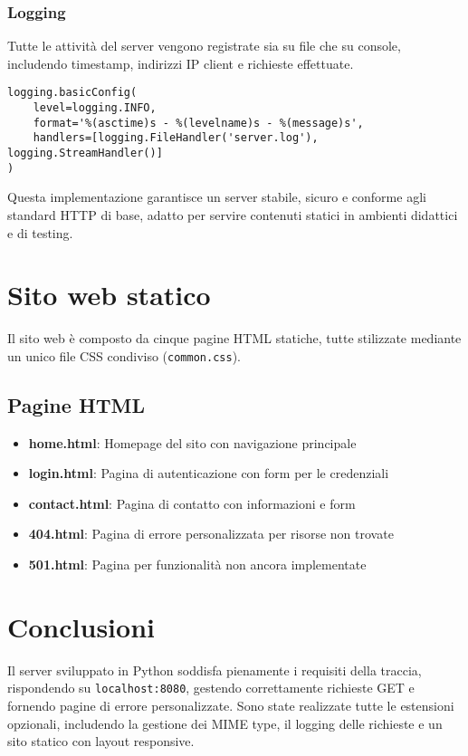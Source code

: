 \documentclass[a4paper,12pt]{report}
\begin{document}
\subsection{Logging}
Tutte le attività del server vengono registrate sia su file che su console, includendo timestamp, indirizzi IP client e richieste effettuate.

\begin{lstlisting}
logging.basicConfig(
    level=logging.INFO,
    format='%(asctime)s - %(levelname)s - %(message)s',
    handlers=[logging.FileHandler('server.log'), logging.StreamHandler()]
)
\end{lstlisting}

Questa implementazione garantisce un server stabile, sicuro e conforme agli standard HTTP di base, adatto per servire contenuti statici in ambienti didattici e di testing.

\chapter{Sito web statico}

Il sito web è composto da cinque pagine HTML statiche, tutte stilizzate mediante un unico file CSS condiviso (\texttt{common.css}).

\section{Pagine HTML}

\begin{itemize}
    \item \textbf{home.html}: Homepage del sito con navigazione principale
    \item \textbf{login.html}: Pagina di autenticazione con form per le credenziali
    \item \textbf{contact.html}: Pagina di contatto con informazioni e form
    \item \textbf{404.html}: Pagina di errore personalizzata per risorse non trovate
    \item \textbf{501.html}: Pagina per funzionalità non ancora implementate
\end{itemize}

\chapter{Conclusioni}

Il server sviluppato in Python soddisfa pienamente i requisiti della traccia, rispondendo su \texttt{localhost:8080}, gestendo correttamente richieste GET e fornendo pagine di errore personalizzate. 
Sono state realizzate tutte le estensioni opzionali, includendo la gestione dei MIME type, il logging delle richieste e un sito statico con layout responsive. 
\end{document}
